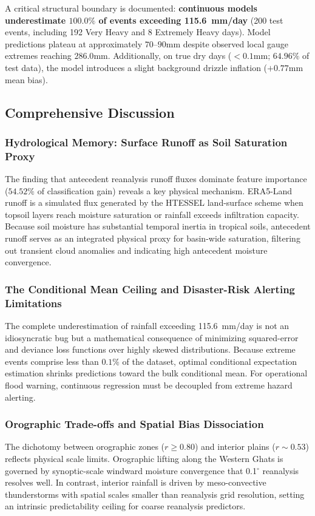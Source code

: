 \documentclass[12pt]{article}
\begin{document}
A critical structural boundary is documented: \textbf{continuous models underestimate $100.0\%$ of events exceeding 115.6~mm/day} (200 test events, including 192 Very Heavy and 8 Extremely Heavy days). Model predictions plateau at approximately $70$--$90$\;mm despite observed local gauge extremes reaching $286.0$\;mm. Additionally, on true dry days ($<0.1$\;mm; $64.96\%$ of test data), the model introduces a slight background drizzle inflation ($+0.77$\;mm mean bias).

\subsection{Comprehensive Discussion}

\subsubsection{Hydrological Memory: Surface Runoff as Soil Saturation Proxy}
The finding that antecedent reanalysis runoff fluxes dominate feature importance ($54.52\%$ of classification gain) reveals a key physical mechanism. ERA5-Land runoff is a simulated flux generated by the HTESSEL land-surface scheme when topsoil layers reach moisture saturation or rainfall exceeds infiltration capacity. Because soil moisture has substantial temporal inertia in tropical soils, antecedent runoff serves as an integrated physical proxy for basin-wide saturation, filtering out transient cloud anomalies and indicating high antecedent moisture convergence.

\subsubsection{The Conditional Mean Ceiling and Disaster-Risk Alerting Limitations}
The complete underestimation of rainfall exceeding 115.6~mm/day is not an idiosyncratic bug but a mathematical consequence of minimizing squared-error and deviance loss functions over highly skewed distributions. Because extreme events comprise less than $0.1\%$ of the dataset, optimal conditional expectation estimation shrinks predictions toward the bulk conditional mean. For operational flood warning, continuous regression must be decoupled from extreme hazard alerting.

\subsubsection{Orographic Trade-offs and Spatial Bias Dissociation}
The dichotomy between orographic zones ($r \ge 0.80$) and interior plains ($r \sim 0.53$) reflects physical scale limits. Orographic lifting along the Western Ghats is governed by synoptic-scale windward moisture convergence that 0.1$^\circ$ reanalysis resolves well. In contrast, interior rainfall is driven by meso-convective thunderstorms with spatial scales smaller than reanalysis grid resolution, setting an intrinsic predictability ceiling for coarse reanalysis predictors.
\end{document}
